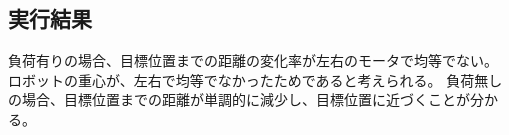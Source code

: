 \subsection{実行結果}
負荷有りの場合、目標位置までの距離の変化率が左右のモータで均等でない。
ロボットの重心が、左右で均等でなかったためであると考えられる。
負荷無しの場合、目標位置までの距離が単調的に減少し、目標位置に近づくことが分かる。
\begin{figure}[H]
  \begin{center}
  \end{center}
\end{figure}

